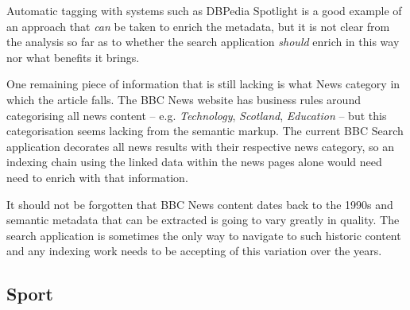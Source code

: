 Automatic tagging with systems such as DBPedia Spotlight is a good
example of an approach that \emph{can} be taken to enrich
the metadata, but it is not clear from the analysis so far as to
whether the search application \emph{should} enrich in this way
nor what benefits it brings.

One remaining piece of information that is still lacking is
what News category in which the article falls. The BBC News
website has business rules around categorising all news
content -- e.g. \emph{Technology}, \emph{Scotland}, \emph{Education}
-- but this categorisation seems lacking from the semantic markup. The
current BBC Search application decorates all news results with
their respective news category, so an indexing chain using
the linked data within the news pages alone would need need
to enrich with that information.

It should not be forgotten that BBC News content dates back to the
1990s and semantic metadata that can be extracted is going
to vary greatly in quality. The search application is sometimes
the only way to navigate to such historic content and any indexing
work needs to be accepting of this variation over the years.

\subsection{Sport}

